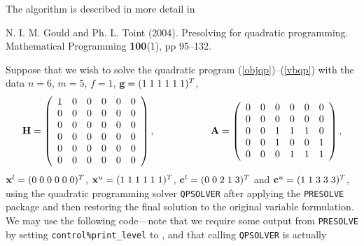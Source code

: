\documentclass{galahad}
\newcommand{\packagename}{PRESOLVE}
\newcommand{\sym}{\tt\small}
\begin{document}
\vspace*{1mm}

\galreferences
\vspace*{1mm}

\noindent
The algorithm is described in more detail in
\vspace*{1mm}

\noindent
N. I. M. Gould and Ph. L. Toint (2004).
Presolving for quadratic programming.
Mathematical Programming {\bf 100}(1), pp 95--132.
\vspace*{1mm}



\galexample
Suppose that we wish to solve the quadratic program
(\ref{objqp})--(\ref{vbqp}) with the data $n = 6$, $m = 5$, $f = 1$, 
${\mathbf{g}} = ( 1 \; 1 \; 1 \; 1 \; 1 \; 1)^T$,
\[
{\mathbf{H}} =\left(\begin{array}{cccccc}
        1 & 0 & 0 & 0 & 0 & 0 \\
        0 & 0 & 0 & 0 & 0 & 0 \\
        0 & 0 & 0 & 0 & 0 & 0 \\
        0 & 0 & 0 & 0 & 0 & 0 \\
        0 & 0 & 0 & 0 & 0 & 0 \\
        0 & 0 & 0 & 0 & 0 & 0 \\
        \end{array}\right),
\hspace*{2cm}
{\mathbf{A}} = \left(\begin{array}{cccccc}
        0 & 0 & 0 & 0 & 0 & 0 \\
        0 & 0 & 0 & 0 & 0 & 0 \\
        0 & 0 & 1 & 1 & 1 & 0 \\
        0 & 0 & 1 & 0 & 0 & 1 \\
        0 & 0 & 0 & 1 & 1 & 1 \\
        \end{array}\right),
\]        
${\mathbf{x}}^l = ( 0\; 0\; 0\; 0\; 0\; 0 )^T$, 
${\mathbf{x}}^u = ( 1 \; 1 \; 1 \; 1 \; 1 \; 1 )^T$, 
${\mathbf{c}}^l = ( 0 \; 0 \; 2 \; 1 \; 3 )^T$ and 
${\mathbf{c}}^u = ( 1 \; 1 \; 3 \; 3 \; 3 )^T$,
using the quadratic programming solver {\tt QPSOLVER} after applying
the {\tt \packagename} package and then restoring the final solution to the 
original
variable formulation. We may use the following code---note that we require
some output from {\tt \packagename} by setting {\tt control\%print\_level} to
{\sym \galsymtrace}, and that calling {\tt QPSOLVER} is actually
\end{document}
